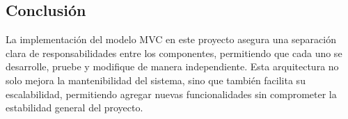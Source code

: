 \subsection{Conclusión}

La implementación del modelo MVC en este proyecto asegura una separación clara de responsabilidades entre los componentes, permitiendo que cada uno se desarrolle, pruebe y modifique de manera independiente. Esta arquitectura no solo mejora la mantenibilidad del sistema, sino que también facilita su escalabilidad, permitiendo agregar nuevas funcionalidades sin comprometer la estabilidad general del proyecto.
